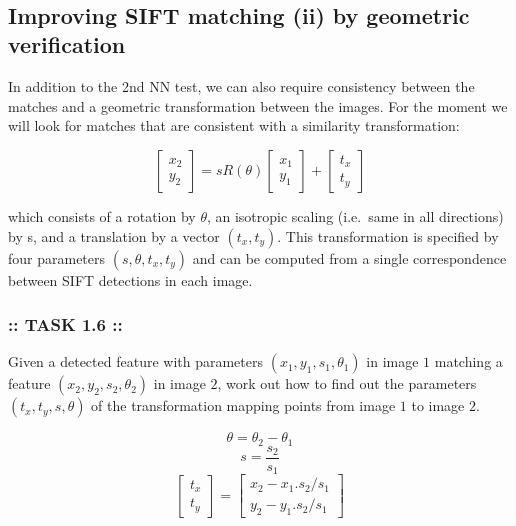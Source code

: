 \documentclass[11pt]{article}
\begin{document}
    \begin{center}
    \end{center}
    { \hspace*{\fill} \\}
    
    \hypertarget{improving-sift-matching-ii-by-geometric-verification}{%
\subsection{Improving SIFT matching (ii) by geometric
verification}\label{improving-sift-matching-ii-by-geometric-verification}}

    In addition to the 2nd NN test, we can also require consistency between
the matches and a geometric transformation between the images. For the
moment we will look for matches that are consistent with a similarity
transformation:

\[\begin{bmatrix} x_2 \\ y_2 \end{bmatrix} = 
sR(\theta) \begin{bmatrix} x_1 \\ y_1 \end{bmatrix} + \begin{bmatrix} t_x \\ t_y \end{bmatrix} \]

which consists of a rotation by \(\theta\), an isotropic scaling
(i.e.~same in all directions) by s, and a translation by a vector
\((t_x, t_y)\). This transformation is specified by four parameters
\((s,\theta,t_x,t_y)\) and can be computed from a single correspondence
between SIFT detections in each image.

    \hypertarget{task-1.6}{%
\subsubsection{:: TASK 1.6 ::}\label{task-1.6}}

Given a detected feature with parameters \((x_1, y_1, s_1, \theta_1)\)
in image \(1\) matching a feature \((x_2, y_2, s_2, \theta_2)\) in image
\(2\), work out how to find out the parameters \((t_x,t_y,s,\theta)\) of
the transformation mapping points from image \(1\) to image \(2\).

    \[\theta=\theta_2-\theta_1\] \[s=\frac{s_2}{s_1}\]
\[\begin{bmatrix} t_x \\ t_y \end{bmatrix} = \begin{bmatrix} x_2-x_1. s_2/s_1 \\ y_2-y_1. s_2/s_1 \end{bmatrix}\]
\end{document}

